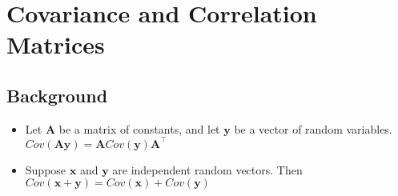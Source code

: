 \documentclass{article}
\begin{document}
\section{Covariance and Correlation Matrices}

\subsection{Background}
\begin{itemize}
    \item Let $\mathbf{A}$ be a matrix of constants, and let $\mathbf{y}$ be a vector of random variables.$Cov(\mathbf{Ay}) = \mathbf{A}Cov(\mathbf{y})\mathbf{A}^\intercal$
    \item Suppose $\mathbf{x}$ and $\mathbf{y}$ are independent random vectors. Then $Cov(\mathbf{x}+\mathbf{y})= Cov(\mathbf{x}) + Cov(\mathbf{y})$
\end{itemize}
\end{document}
